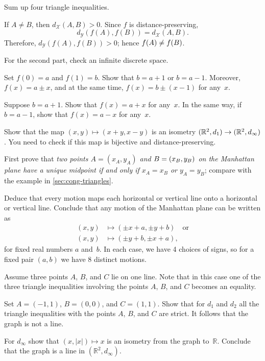  Sum up four triangle inequalities.

If $A\ne B$, then $d_\mathcal{X}(A,B)>0$.
Since $f$ is distance-preserving,
$$d_\mathcal{Y}(f(A),f(B))=d_\mathcal{X}(A,B).$$
Therefore, $d_\mathcal{Y}(f(A),f(B))>0$; hence $f(A)\z\ne f(B)$.

For the second part, check an infinite discrete space.

Set $f(0)=a$ and $f(1)=b$.
Show that $b=a+1$ or $b=a-1$.
Moreover, $f(x)=a\pm x$, and at the same time, $f(x)=b\pm(x-1)$ for any~$x$.

Suppose $b=a+1$. 
Show that 
$f(x)=a+x$ for any~$x$.
In the same way, if $b=a-1$, 
show that 
$f(x)=a-x$ for any~$x$.

Show that the map $(x,y)\mapsto (x+y,x-y)$ is an isometry  $(\mathbb{R}^2,d_1)\z\to (\mathbb{R}^2,d_\infty)$.
You need to check if this map is bijective and distance-preserving.

First prove that \textit{two points $A=(x_A,y_A)$ and $B\z=(x_B,y_B)$ on the Manhattan plane have a unique midpoint if and only if $x_A=x_B$ or $y_A=y_B$}; compare with the example in \ref{sec:cong-triangles}. 

Deduce that every motion maps each horizontal or vertical line onto a horizontal or vertical line.
Conclude that
any motion of the Manhattan plane 
can be written as
\begin{align*}
(x,y)&\mapsto (\pm x+a,\pm y+b)\quad\text{or}
\\
(x,y)&\mapsto (\pm y+b,\pm x+a),
\end{align*}
for fixed real numbers $a$ and~$b$.
In each case, we have 4 choices of signs, so for a fixed pair $(a,b)$ we have 8 distinct motions.

Assume three points $A$, $B$, and $C$ lie on one line.
Note that in this case one of the three triangle inequalities involving the points $A$, $B$, and $C$ becomes an equality.


Set $A=(-1,1)$, $B=(0,0)$, and $C=(1,1)$.
Show that for $d_1$ and $d_2$
all the triangle inequalities with the points $A$, $B$, and $C$ are strict.
It follows that the graph is not a line.

For $d_\infty$ show that $(x,|x|)\mapsto x$ is an isometry from the graph to~$\mathbb{R}$.
Conclude that the graph is a line in $(\mathbb{R}^2,d_\infty)$.

